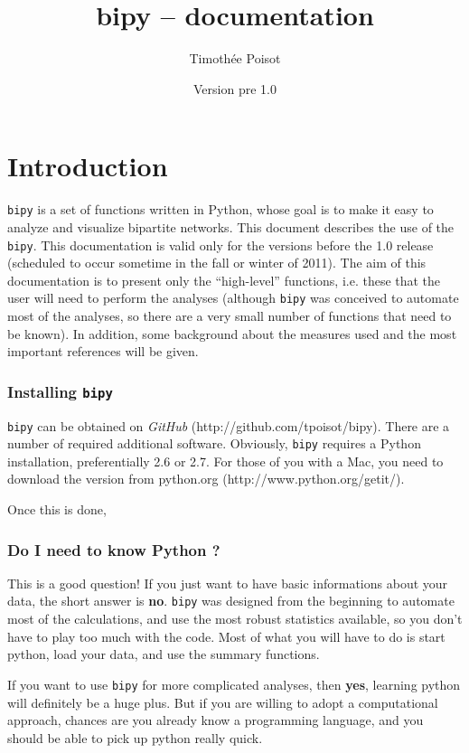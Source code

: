 \documentclass[nols,b5paper]{tufte-book}
\title{bipy -- documentation}
\author[\textsc{bipy user manual}]{Timothée Poisot}
\date{Version pre 1.0}
\begin{document}
\maketitle
\tableofcontents

\chapter{Introduction}

\texttt{bipy} is a set of functions written in Python, whose goal is to make it easy to analyze and visualize bipartite networks. This document describes the use of the \texttt{bipy}. This documentation is valid only for the versions before the 1.0 release (scheduled to occur sometime in the fall or winter of 2011). The aim of this documentation is to present only the ``high-level'' functions, i.e. these that the user will need to perform the analyses (although \texttt{bipy} was conceived to automate most of the analyses, so there are a very small number of functions that need to be known). In addition, some background about the measures used and the most important references will be given.

\subsection{Installing \texttt{bipy}}

\texttt{bipy} can be obtained on \emph{GitHub} (http://github.com/tpoisot/bipy). There are a number of required additional software. Obviously, \texttt{bipy} requires a Python installation, preferentially 2.6 or 2.7. For those of you with a Mac, you need to download the version from python.org (http://www.python.org/getit/).

Once this is done, 

\subsection{Do I need to know Python ?}

This is a good question! If you just want to have basic informations about your data, the short answer is \textbf{no}. \texttt{bipy} was designed from the beginning to automate most of the calculations, and use the most robust statistics available, so you don't have to play too much with the code. Most of what you will have to do is start python, load your data, and use the summary functions.

If you want to use \texttt{bipy} for more complicated analyses, then \textbf{yes}, learning python will definitely be a huge plus. But if you are willing to adopt a computational approach, chances are you already know a programming language, and you should be able to pick up python really quick.
\end{document}

